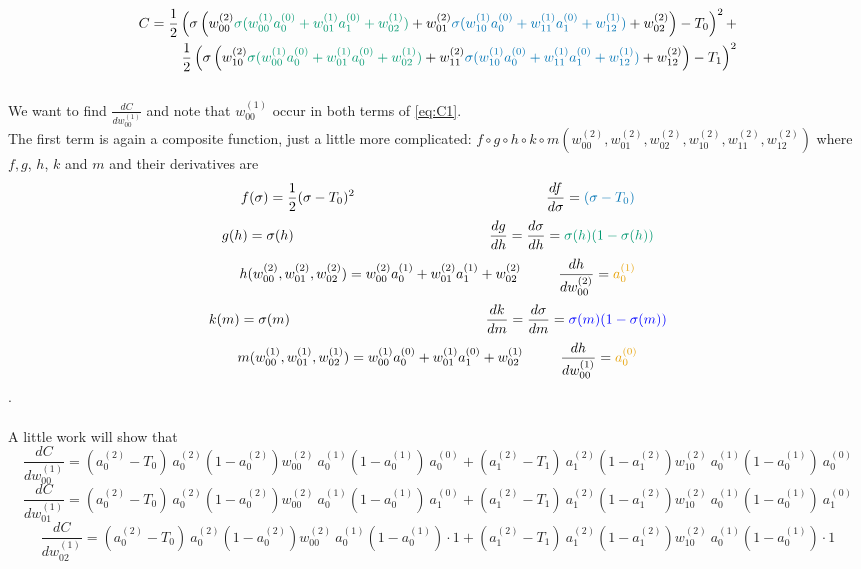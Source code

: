\documentclass{article}
\begin{document}
\begin{equation} \label{eq:C1}
\begin{aligned}
C = \frac {1}{2} \left(\sigma\left(w_{00}^{(2)}\textcolor{green}{\sigma(w_{00}^{(1)}a_0^{(0)}+w_{01}^{(1)}a_1^{(0)}+w_{02}^{(1)})}
+w_{01}^{(2)}\textcolor{darkblue}{\sigma(w_{10}^{(1)}a_0^{(0)}+w_{11}^{(1)}a_1^{(0)}+w_{12}^{(1)})}+w_{02}^{(2)}\right)-T_0\right)^2 +
\\
\frac {1}{2}\left(\sigma\left(w_{10}^{(2)}\textcolor{green}{\sigma(w_{00}^{(1)}a_0^{(0)}+w_{01}^{(1)}a_0^{(0)}+w_{02}^{(1)})}+w_{11}^{(2)}\textcolor{darkblue}{\sigma(w_{10}^{(1)}a_0^{(0)}+w_{11}^{(1)}a_1^{(0)}+w_{12}^{(1)})}+w_{12}^{(2)}\right)-T_1\right)^2
\end{aligned}
\end{equation}
\\
We want to find $\frac{dC}{dw_{00}^{(1)}}$ and note that $w_{00}^{(1)}$ occur in both terms of \eqref{eq:C1}.
\\
The first term is again a composite function, just a little more complicated: $f \circ g \circ h \circ k \circ m(w_{00}^{(2)}, w_{01}^{(2)}, w_{02}^{(2)}, w_{10}^{(2)}, w_{11}^{(2)},w_{12}^{(2)})$ where $f, g$, $h$, $k$ and $m$ and their derivatives are
$$f(\sigma) = \frac {1}{2}(\sigma-T_0)^2~~~~~~~~~~~~~~~~~~~~~~~~~~~~~~~~~~~~~~~~~\frac{df}{d\sigma} = \textcolor{darkblue}{(\sigma-T_0)}$$
$$g(h) = \sigma(h)~~~~~~~~~~~~~~~~~~~~~~~~~~~~~~~~~~~~~~~~~~\frac{dg}{dh} = \frac{d\sigma}{dh} = \textcolor{green}{\sigma(h)(1 - \sigma(h))}$$
$$h(w_{00}^{(2)}, w_{01}^{(2)}, w_{02}^{(2)}) = w_{00}^{(2)}a_0^{(1)}+w_{01}^{(2)}a_1^{(1)}+w_{02}^{(2)}~~~~~~~~\frac{dh}{dw_{00}^{(2)}} = \textcolor{orange}{a_0^{(1)}}$$
$$k(m) = \sigma(m)~~~~~~~~~~~~~~~~~~~~~~~~~~~~~~~~~~~~~~~~~~\frac{dk}{dm} = \frac{d\sigma}{dm} = \textcolor{blue}{\sigma(m)(1 - \sigma(m))}$$
$$m(w_{00}^{(1)}, w_{01}^{(1)}, w_{02}^{(1)}) = w_{00}^{(1)}a_0^{(0)}+w_{01}^{(1)}a_1^{(0)}+w_{02}^{(1)}~~~~~~~~\frac{dh}{dw_{00}^{(1)}} = \textcolor{orange}{a_0^{(0)}}$$.
\\
\\
A little work will show that
$$\frac{dC}{dw_{00}^{(1)}} = (a_0^{(2)}-T_0)~a_0^{(2)}(1-a_0^{(2)})w_{00}^{(2)}~a_0^{(1)}(1-a_0^{(1)})~a_0^{(0)} + (a_1^{(2)}-T_1)~a_1^{(2)}(1-a_1^{(2)})w_{10}^{(2)}~a_0^{(1)}(1-a_0^{(1)})~a_0^{(0)}$$
$$\frac{dC}{dw_{01}^{(1)}} = (a_0^{(2)}-T_0)~a_0^{(2)}(1-a_0^{(2)})w_{00}^{(2)}~a_0^{(1)}(1-a_0^{(1)})~a_1^{(0)} + (a_1^{(2)}-T_1)~a_1^{(2)}(1-a_1^{(2)})w_{10}^{(2)}~a_0^{(1)}(1-a_0^{(1)})~a_1^{(0)}$$
$$\frac{dC}{dw_{02}^{(1)}} = (a_0^{(2)}-T_0)~a_0^{(2)}(1-a_0^{(2)})w_{00}^{(2)}~a_0^{(1)}(1-a_0^{(1)})\cdot 1 + (a_1^{(2)}-T_1)~a_1^{(2)}(1-a_1^{(2)})w_{10}^{(2)}~a_0^{(1)}(1-a_0^{(1)})\cdot 1$$
\end{document}
